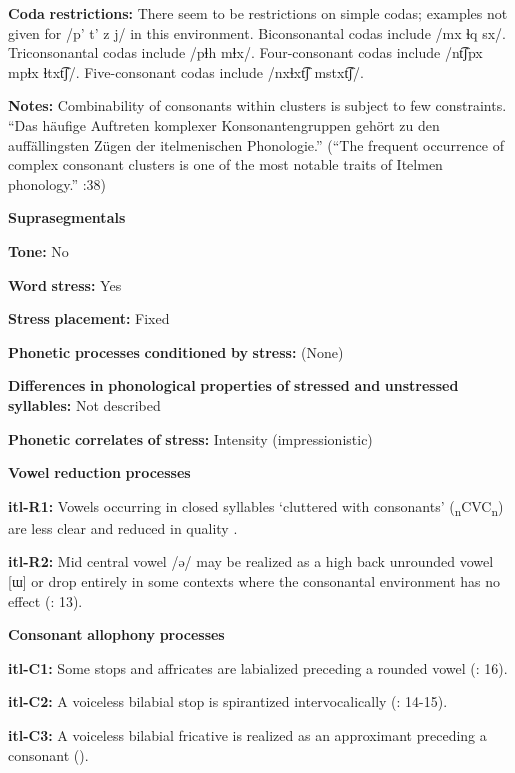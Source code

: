 \textbf{Coda} \textbf{restrictions:} There seem to be restrictions on simple codas; examples not given for /p’ t’ z j/ in this environment. Biconsonantal codas include /mx ɬq sx/. Triconsonantal codas include /pɬh mɬx/. Four-consonant codas include /nt͡ʃpx mpɬx ɬtxt͡ʃ/. Five-consonant codas include /nxɬxt͡ʃ mstxt͡ʃ/.

\textbf{Notes:} Combinability of consonants within clusters is subject to few constraints. “Das häufige Auftreten komplexer Konsonantengruppen gehört zu den auffällingsten Zügen der itelmenischen Phonologie.” (“The frequent occurrence of complex consonant clusters is one of the most notable traits of Itelmen phonology.” \citealt{GeorgVolodin1999}:38)

\textbf{Suprasegmentals}

\textbf{Tone:} No

\textbf{Word} \textbf{stress:} Yes

\textbf{Stress} \textbf{placement:} Fixed

\textbf{Phonetic} \textbf{processes} \textbf{conditioned} \textbf{by} \textbf{stress:} (None)

\textbf{Differences} \textbf{in} \textbf{phonological} \textbf{properties} \textbf{of} \textbf{stressed} \textbf{and} \textbf{unstressed} \textbf{syllables:} Not described

\textbf{Phonetic} \textbf{correlates} \textbf{of} \textbf{stress:} Intensity (impressionistic)

\textbf{Vowel} \textbf{reduction} \textbf{processes}

\textbf{itl-R1:} Vowels occurring in closed syllables ‘cluttered with consonants’ (\textsubscript{n}CVC\textsubscript{n}) are less clear and reduced in quality \citep[73]{Volodin1976}.

\textbf{itl-R2:} Mid central vowel /ə/ may be realized as a high back unrounded vowel [ɯ] or drop entirely in some contexts where the consonantal environment has no effect (\citealt{GeorgVolodin1999}: 13).

\textbf{Consonant} \textbf{allophony} \textbf{processes}

\textbf{itl-C1:} Some stops and affricates are labialized preceding a rounded vowel (\citealt{GeorgVolodin1999}: 16).

\textbf{itl-C2:} A voiceless bilabial stop is spirantized intervocalically (\citealt{GeorgVolodin1999}: 14-15).

\textbf{itl-C3:} A voiceless bilabial fricative is realized as an approximant preceding a consonant (\citealt{GeorgVolodin1999}).

